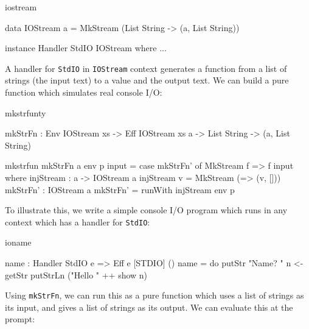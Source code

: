 \begin{SaveVerbatim}{iostream}

data IOStream a 
   = MkStream (List String -> (a, List String))

instance Handler StdIO IOStream where
    ...
\end{SaveVerbatim}

\noindent
A handler for \texttt{StdIO} in \texttt{IOStream} context generates a function
from a list of strings (the input text) to a value and the output text. We
can build a pure function which simulates real console I/O:

\begin{SaveVerbatim}{mkstrfunty}

mkStrFn : Env IOStream xs -> Eff IOStream xs a -> 
          List String -> (a, List String)
\end{SaveVerbatim}

\begin{SaveVerbatim}{mkstrfun}
mkStrFn {a} env p input = case mkStrFn' of
                               MkStream f => f input
  where injStream : a -> IOStream a
        injStream v = MkStream (\x => (v, []))
        mkStrFn' : IOStream a
        mkStrFn' = runWith injStream env p

\end{SaveVerbatim}

\noindent
To illustrate this, we write a simple console I/O program which runs in
any context which has a handler for \texttt{StdIO}:

\begin{SaveVerbatim}{ioname}

name : Handler StdIO e => Eff e [STDIO] ()
name = do putStr "Name? "
          n <- getStr
          putStrLn ("Hello " ++ show n)

\end{SaveVerbatim}

\noindent
Using \texttt{mkStrFn}, we can run this as a pure function which uses a list
of strings as its input, and gives a list of strings as its output. We can
evaluate this at the \Idris{} prompt:


